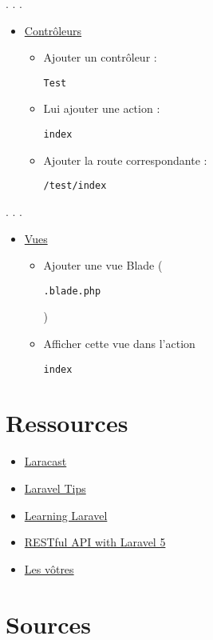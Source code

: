 . . .

\begin{itemize}
\tightlist
\item
  \href{https://laravel.com/docs/master/controllers}{Contrôleurs}

  \begin{itemize}
  \tightlist
  \item
    Ajouter un contrôleur :
    \begin{otherlanguage}{english}\texttt{Test}\end{otherlanguage}
  \item
    Lui ajouter une action :
    \begin{otherlanguage}{english}\texttt{index}\end{otherlanguage}
  \item
    Ajouter la route correspondante :
    \begin{otherlanguage}{english}\texttt{/test/index}\end{otherlanguage}
  \end{itemize}
\end{itemize}

. . .

\begin{itemize}
\tightlist
\item
  \href{https://laravel.com/docs/master/views}{Vues}

  \begin{itemize}
  \tightlist
  \item
    Ajouter une vue Blade
    (\begin{otherlanguage}{english}\texttt{.blade.php}\end{otherlanguage})
  \item
    Afficher cette vue dans l'action
    \begin{otherlanguage}{english}\texttt{index}\end{otherlanguage}
  \end{itemize}
\end{itemize}

\hypertarget{ressources}{%
\section{Ressources}\label{ressources}}

\begin{itemize}
\tightlist
\item
  \href{https://laracasts.com/series/laravel-5-fundamentals}{Laracast}
\item
  \href{https://laraveltips.wordpress.com/}{Laravel Tips}
\item
  \href{http://learninglaravel.net/tags/tutorials}{Learning Laravel}
\item
  \href{http://www.tutorials.kode-blog.com/laravel-5-rest-api}{RESTful
  API with Laravel 5}
\item
  \href{https://github.com/HE-Arc/slides-devweb/wiki/Ressources}{Les
  vôtres}
\end{itemize}

\begin{otherlanguage}{english}

\end{otherlanguage}

\hypertarget{sources}{%
\section{Sources}\label{sources}}
